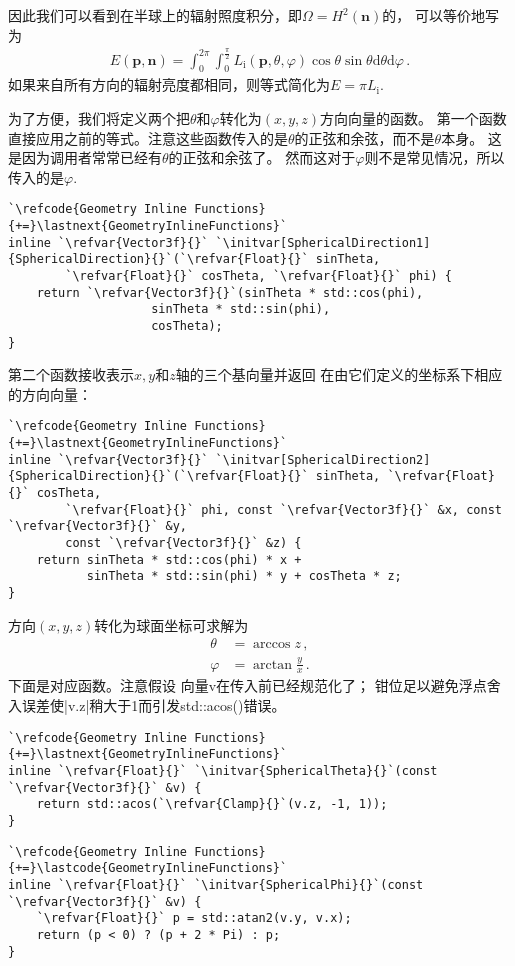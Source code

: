 因此我们可以看到在半球上的辐射照度积分，即$\Omega=H^2({\bm n})$的，
可以等价地写为
\begin{align*}
    E({\bm p},{\bm n})=\int_0^{2\pi}\int_0^{\frac{\pi}{2}}L_{\mathrm{i}}({\bm p},\theta,\varphi)\cos\theta\sin\theta\mathrm{d}\theta\mathrm{d}\varphi\, .
\end{align*}
如果来自所有方向的辐射亮度都相同，则等式简化为$E=\pi L_{\mathrm{i}}$.

为了方便，我们将定义两个把$\theta$和$\varphi$转化为$(x,y,z)$方向向量的函数。
第一个函数直接应用之前的等式。注意这些函数传入的是$\theta$的正弦和余弦，而不是$\theta$本身。
这是因为调用者常常已经有$\theta$的正弦和余弦了。
然而这对于$\varphi$则不是常见情况，所以传入的是$\varphi$.
\begin{lstlisting}
`\refcode{Geometry Inline Functions}{+=}\lastnext{GeometryInlineFunctions}`
inline `\refvar{Vector3f}{}` `\initvar[SphericalDirection1]{SphericalDirection}{}`(`\refvar{Float}{}` sinTheta, 
        `\refvar{Float}{}` cosTheta, `\refvar{Float}{}` phi) {
    return `\refvar{Vector3f}{}`(sinTheta * std::cos(phi), 
                    sinTheta * std::sin(phi),
                    cosTheta);
}
\end{lstlisting}

第二个函数接收表示$x,y$和$z$轴的三个基向量并返回
在由它们定义的坐标系下相应的方向向量：
\begin{lstlisting}
`\refcode{Geometry Inline Functions}{+=}\lastnext{GeometryInlineFunctions}`
inline `\refvar{Vector3f}{}` `\initvar[SphericalDirection2]{SphericalDirection}{}`(`\refvar{Float}{}` sinTheta, `\refvar{Float}{}` cosTheta, 
        `\refvar{Float}{}` phi, const `\refvar{Vector3f}{}` &x, const `\refvar{Vector3f}{}` &y,
        const `\refvar{Vector3f}{}` &z) {
    return sinTheta * std::cos(phi) * x +
           sinTheta * std::sin(phi) * y + cosTheta * z;
}
\end{lstlisting}

方向$(x,y,z)$转化为球面坐标可求解为
\begin{align*}
    \theta  & =\arccos z\, ,          \\
    \varphi & =\arctan\frac{y}{x}\, .
\end{align*}
下面是对应函数。注意假设
向量{\ttfamily v}在传入前已经规范化了；
钳位足以避免浮点舍入误差使{\ttfamily |v.z|}稍大于1而引发{\ttfamily std::acos()}错误。
\begin{lstlisting}
`\refcode{Geometry Inline Functions}{+=}\lastnext{GeometryInlineFunctions}`
inline `\refvar{Float}{}` `\initvar{SphericalTheta}{}`(const `\refvar{Vector3f}{}` &v) {
    return std::acos(`\refvar{Clamp}{}`(v.z, -1, 1));
}
\end{lstlisting}
\begin{lstlisting}
`\refcode{Geometry Inline Functions}{+=}\lastcode{GeometryInlineFunctions}`
inline `\refvar{Float}{}` `\initvar{SphericalPhi}{}`(const `\refvar{Vector3f}{}` &v) {
    `\refvar{Float}{}` p = std::atan2(v.y, v.x);
    return (p < 0) ? (p + 2 * Pi) : p;
}
\end{lstlisting}

